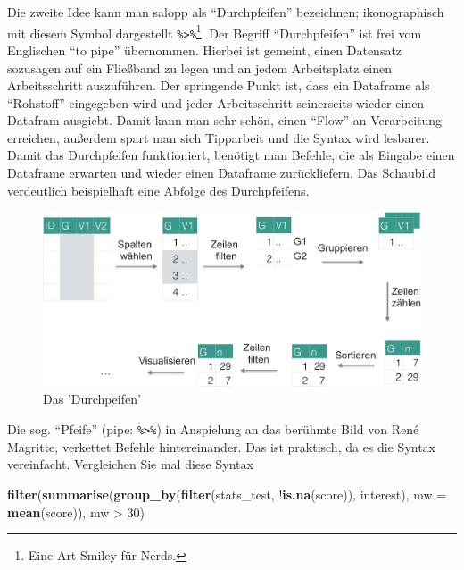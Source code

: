 \documentclass[12pt,]{book}
\newenvironment{Shaded}{\begin{snugshade}}{\end{snugshade}}
\newcommand{\KeywordTok}[1]{\textcolor[rgb]{0.13,0.29,0.53}{\textbf{{#1}}}}
\newcommand{\DataTypeTok}[1]{\textcolor[rgb]{0.13,0.29,0.53}{{#1}}}
\newcommand{\DecValTok}[1]{\textcolor[rgb]{0.00,0.00,0.81}{{#1}}}
\newcommand{\StringTok}[1]{\textcolor[rgb]{0.31,0.60,0.02}{{#1}}}
\newcommand{\NormalTok}[1]{{#1}}
\let\rmarkdownfootnote\footnote%
\def\footnote{\protect\rmarkdownfootnote}
\begin{document}
Die zweite Idee kann man salopp als ``Durchpfeifen'' bezeichnen;
ikonographisch mit diesem Symbol dargestellt
\texttt{\%\textgreater{}\%}\footnote{Eine Art Smiley für Nerds.}. Der
Begriff ``Durchpfeifen'' ist frei vom Englischen ``to pipe'' übernommen.
Hierbei ist gemeint, einen Datensatz sozusagen auf ein Fließband zu
legen und an jedem Arbeitsplatz einen Arbeitsschritt auszuführen. Der
springende Punkt ist, dass ein Dataframe als ``Rohstoff'' eingegeben
wird und jeder Arbeitsschritt seinerseits wieder einen Datafram
ausgiebt. Damit kann man sehr schön, einen ``Flow'' an Verarbeitung
erreichen, außerdem spart man sich Tipparbeit und die Syntax wird
lesbarer. Damit das Durchpfeifen funktioniert, benötigt man Befehle, die
als Eingabe einen Dataframe erwarten und wieder einen Dataframe
zurückliefern. Das Schaubild verdeutlich beispielhaft eine Abfolge des
Durchpfeifens.

\begin{figure}

{\centering \includegraphics[width=0.8\linewidth]{images/durchpfeifen} 

}

\caption{Das 'Durchpeifen'}\label{fig:fig-durchpreifen}
\end{figure}

Die sog. ``Pfeife'' (pipe: \texttt{\%\textgreater{}\%}) in Anspielung an
das berühmte Bild von René Magritte, verkettet Befehle hintereinander.
Das ist praktisch, da es die Syntax vereinfacht. Vergleichen Sie mal
diese Syntax

\begin{Shaded}
\begin{Highlighting}[]
\KeywordTok{filter}\NormalTok{(}\KeywordTok{summarise}\NormalTok{(}\KeywordTok{group_by}\NormalTok{(}\KeywordTok{filter}\NormalTok{(stats_test, !}\KeywordTok{is.na}\NormalTok{(score)), interest), }\DataTypeTok{mw =} \KeywordTok{mean}\NormalTok{(score)), mw >}\StringTok{ }\DecValTok{30}\NormalTok{)}
\end{Highlighting}
\end{Shaded}
\end{document}
